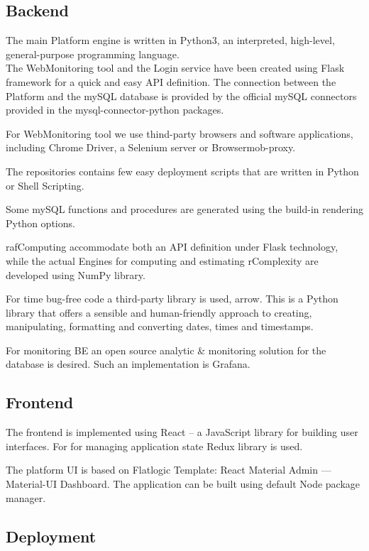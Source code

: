 \subsection{Backend}
The main Platform engine is written in Python3, an interpreted, high-level, general-purpose programming language. \\

The WebMonitoring tool and the Login service have been created using Flask framework for a quick and easy API definition. The connection between the Platform and the mySQL database is provided by the official mySQL connectors provided in the mysql-connector-python packages.

For WebMonitoring tool we use thind-party browsers and software applications, including Chrome Driver, a Selenium server or Browsermob-proxy.

The repositories contains few easy deployment scripts that are written in Python or Shell Scripting.

Some mySQL functions and procedures are generated using the build-in rendering Python options.

rafComputing accommodate both an API definition under Flask technology, while the actual Engines for computing and estimating rComplexity are developed using NumPy library.

For time bug-free code a third-party library is used, arrow. This is a Python library that offers a sensible and human-friendly approach to creating, manipulating, formatting and converting dates, times and timestamps.

For monitoring BE an open source analytic \& monitoring solution for the database is desired. Such an implementation is Grafana.

\subsection{Frontend}
The frontend is implemented using React – a JavaScript library for building user interfaces. 
For for managing application state Redux library is used.

The platform UI is based on Flatlogic Template: React Material Admin — Material-UI Dashboard. The application can be built using default Node package manager.

\subsection{Deployment}

